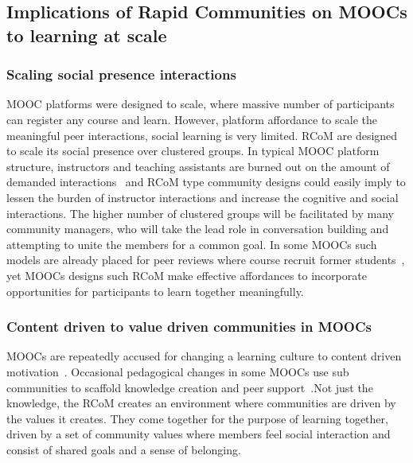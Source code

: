 \documentclass[format=acmsmall, review=false, screen=true]{acmart}
\newcommand{\msb}[1]{{\textcolor{blue}{ [Michael: #1]}}}
\newcommand{\dil}[1]{{\textcolor{magenta}{ Dilrukshi: #1]}}}
\begin{document}
\subsection{Implications of Rapid Communities on MOOCs to learning at scale}

\subsubsection{Scaling social presence interactions} 
MOOC platforms were designed to scale, where massive number of participants can register any course and learn. However, platform affordance to scale the meaningful peer interactions, social learning is very limited. RCoM are designed to scale its social presence over clustered groups. In typical MOOC platform structure, instructors and teaching assistants are burned out on the amount of demanded interactions~\cite{zheng2016ask} and RCoM type community designs could easily imply to lessen the burden of instructor interactions and increase the cognitive and social interactions. The higher number of clustered groups will be facilitated by many community managers, who will take the lead role in conversation building and attempting to unite the members for a common goal. In some MOOCs such models are already placed for peer reviews where course recruit former students~\cite{joyner2018toward}, yet MOOCs designs such RCoM make effective affordances to incorporate opportunities for participants to learn together meaningfully. 


\subsubsection{Content driven to value driven communities in MOOCs} 
MOOCs are repeatedly accused for changing a learning culture to content driven motivation~\cite{wang2015content}. Occasional pedagogical changes in some MOOCs use sub communities to scaffold knowledge creation and peer support~\cite{sharif2015discussion}.Not just the knowledge, the RCoM creates an environment where communities are driven by the values it creates. They come together for the purpose of learning together, driven by a set of community values where members feel social interaction and consist of shared goals and a sense of belonging. 
\end{document}
